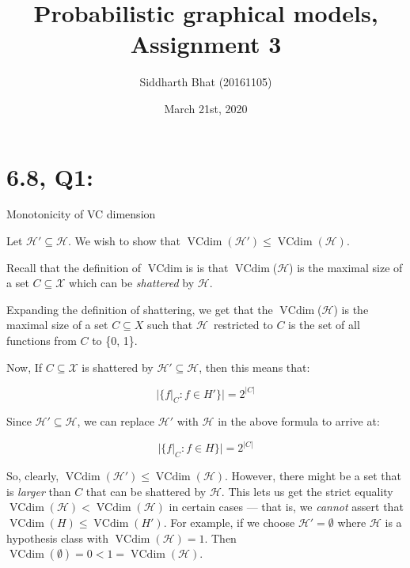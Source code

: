 \documentclass[11pt]{article}
\title{Probabilistic graphical models, Assignment 3}
\author{Siddharth Bhat (20161105)}
\date{March 21st, 2020}
\renewcommand{\H}{\ensuremath{\mathcal{H}}}
\newcommand{\X}{\ensuremath{\mathcal{X}}}
\DeclareMathOperator{\vcdim}{VCdim}
\newcommand{\vc}{\ensuremath{\vcdim}}
\begin{document}
\maketitle
\section*{6.8, Q1:}
Monotonicity of VC dimension

Let $\H' \subseteq \H$.  We wish to show that $\vc(\H') \leq \vc(\H)$.

Recall that the definition of \vc is is that \vc(\H) is the maximal size of
a set $C \subseteq \X$ which can be \emph{shattered} by \H.

Expanding the definition of shattering, we get that the \vc(\H) is the maximal size
of a set $C \subseteq X$ such that \H~restricted to $C$ is the set of all
functions from $C$ to \{0, 1\}.

Now, If $C \subseteq \X$ is shattered by $\H' \subseteq \H$, then this means
that:

\[
|\{ f|_C : f \in H' \}| = 2^{|C|}
\]

Since $\H' \subseteq \H$, we can
replace $\H'$ with $\H$ in the above formula to arrive at:

\[
|\{ f|_C : f \in H \}| = 2^{|C|}
\]

So, clearly, $\vc(\H') \leq \vc(\H)$.
However, there might be a set that is \emph{larger} than $C$ that can be shattered
by $\H$. This lets us get the strict equality $\vc(\H) < \vc(\H)$ in certain cases
--- that is, we \emph{cannot} assert that $\vc(H) \leq \vc(H')$.
For example, if we choose $\H' = \emptyset$ where $\H$ is a hypothesis class with
$\vcdim(\H) = 1$. Then $\vcdim(\emptyset) = 0 < 1 = \vcdim(\H)$. 
\end{document}
